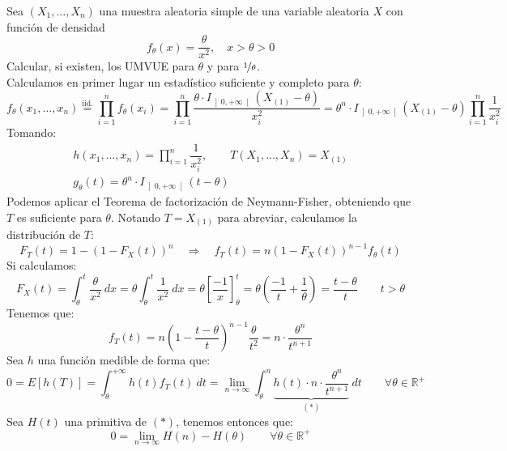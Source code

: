 \begin{ejercicio}
    Sea $(X_1, \ldots, X_n)$ una muestra aleatoria simple de una variable aleatoria $X$ con función de densidad
    \begin{equation*}
        f_\theta(x) = \dfrac{\theta}{x^2}, \quad x>\theta > 0
    \end{equation*}
    Calcular, si existen, los UMVUE para $\theta$ y para $\nicefrac{1}{\theta}$.\\

    \noindent
    Calculamos en primer lugar un estadístico suficiente y completo para $\theta$:
    \begin{equation*}
        f_\theta(x_1,\ldots, x_n) \stackrel{\text{iid.}}{=} \prod_{i=1}^{n}f_\theta(x_i) =\prod_{i=1}^{n} \dfrac{\theta\cdot I_{\left]0,+\infty\right[}(X_{(1)}-\theta)}{x_i^2} = \theta^n \cdot I_{\left]0,+\infty\right[}(X_{(1)}-\theta)\prod_{i=1}^{n} \dfrac{1}{x_i^2}
    \end{equation*}
    Tomando:
    \begin{gather*}
        h(x_1, \ldots, x_n) = \prod_{i=1}^{n}\dfrac{1}{x_i^2}, \qquad T(X_1, \ldots, X_n) = X_{(1)} \\
        g_\theta(t) = \theta^n \cdot I_{\left]0,+\infty\right[}(t-\theta)
    \end{gather*}
    Podemos aplicar el Teorema de factorización de Neymann-Fisher, obteniendo que $T$ es suficiente para $\theta$. Notando $T = X_{(1)}$ para abreviar, calculamos la distribución de $T$:
    \begin{equation*}
        F_T(t) = 1-{(1-F_X(t))}^{n} \quad \Longrightarrow \quad f_T(t) = n{(1-F_X(t))}^{n-1}f_\theta(t)
    \end{equation*}
    Si calculamos:
    \begin{equation*}
        F_X(t) = \int_{\theta}^{t} \dfrac{\theta}{x^2}~dx  = \theta \int_{\theta}^{t} \dfrac{1}{x^2}~dx = \theta \left[\dfrac{-1}{x}\right]_\theta^t = \theta\left(\dfrac{-1}{t}+\dfrac{1}{\theta}\right) = \dfrac{t-\theta}{t} \qquad  t > \theta
    \end{equation*}
    Tenemos que:
    \begin{equation*}
        f_T(t) = n{\left(1-\dfrac{t-\theta}{t}\right)}^{n-1}\dfrac{\theta}{t^2} = n\cdot \dfrac{\theta^{n}}{t^{n+1}}
    \end{equation*}
    Sea $h$ una función medible de forma que:
    \begin{equation*}
        0 = E[h(T)] = \int_{\theta}^{+\infty} h(t)f_T(t)~dt  = \lim_{n\to\infty}\int_{\theta}^{n} \underbrace{h(t)\cdot n\cdot \frac{\theta^n}{t^{n+1}}}_{(\ast)}~dt  \qquad \forall \theta\in \mathbb{R}^+
    \end{equation*}
    Sea $H(t)$ una primitiva de $(\ast)$, tenemos entonces que:
    \begin{equation*}
         0 = \lim_{n\to\infty}H(n) - H(\theta) \qquad \forall \theta\in \mathbb{R}^+
    \end{equation*}


\end{ejercicio}

